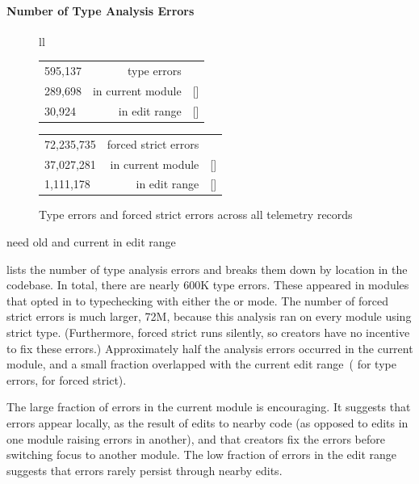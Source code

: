 \documentclass[english,submission,cleveref]{programming}
\begin{document}
\paragraph{Number of Type Analysis Errors}

\begin{figure}[t]
  \begin{tabular}[t]{ll} \\
    \begin{tabular}[t]{l@{~~}r@{~}l}
      595,137 & type errors \\
      289,698 & in current module & [\pct{48.68}] \\
       30,924 & in edit range & [\pct{5.20}]
    \end{tabular}
    \begin{tabular}[t]{l@{~~}r@{~}l}
      72,235,735 & {forced strict errors} \\
      37,027,281 & in current module & [\pct{51.26}] \\
       1,111,178 & in edit range & [\pct{1.54}]
    \end{tabular}
  \end{tabular}
  \caption{Type errors and forced strict errors across all telemetry records}
  \label{f:count-analysis-errors}
\end{figure}

\FILL{} need old and current in edit range

 lists the number of type analysis errors
and breaks them down by location in the codebase.
In total, there are nearly 600K type errors.
These appeared in modules that opted in to typechecking with either the
\mnonstrict{} or \mstrict{} mode.
The number of forced strict errors is much larger, 72M, because this analysis
ran on every module using strict type.
(Furthermore, forced strict runs silently, so creators have no incentive to
fix these errors.)
Approximately half the analysis errors occurred in the current module,
and a small fraction overlapped with the current edit range~( for
type errors,  for forced strict).

The large fraction of errors in the current module is encouraging.
It suggests that errors appear locally, as the result of edits to nearby
code (as opposed to edits in one module raising errors in another), and
that creators fix the errors before switching focus to another
module.
The low fraction of errors in the edit range suggests that errors rarely
persist through nearby edits.
\end{document}
